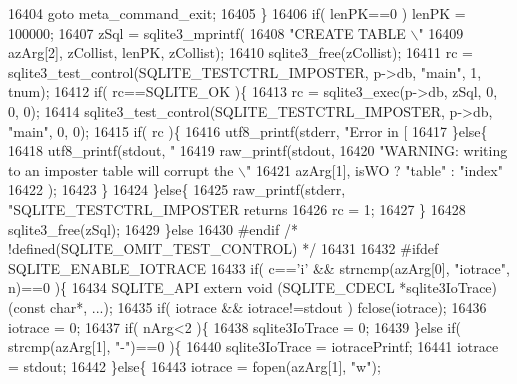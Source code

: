 \begin{DoxyCode}
{{{{{{{{{{{{{{{{{{{{{{{{{{{{{{{{{{{{{{{{{{{{16404       \textcolor{keywordflow}{goto} meta\_command\_exit;
16405     \}
16406     \textcolor{keywordflow}{if}( lenPK==0 ) lenPK = 100000;
16407     zSql = sqlite3_mprintf(
16408           \textcolor{stringliteral}{"CREATE TABLE \(\backslash\)"%
16409           azArg[2], zCollist, lenPK, zCollist);
16410     sqlite3_free(zCollist);
16411     rc = sqlite3_test_control(SQLITE_TESTCTRL_IMPOSTER, p->db, \textcolor{stringliteral}{"main"}, 1, tnum);
16412     \textcolor{keywordflow}{if}( rc==SQLITE_OK )\{
16413       rc = sqlite3_exec(p->db, zSql, 0, 0, 0);
16414       sqlite3_test_control(SQLITE_TESTCTRL_IMPOSTER, p->db, \textcolor{stringliteral}{"main"}, 0, 0);
16415       \textcolor{keywordflow}{if}( rc )\{
16416         utf8_printf(stderr, \textcolor{stringliteral}{"Error in [%
16417       \}\textcolor{keywordflow}{else}\{
16418         utf8_printf(stdout, \textcolor{stringliteral}{"%
16419         raw_printf(stdout,
16420           \textcolor{stringliteral}{"WARNING: writing to an imposter table will corrupt the \(\backslash\)"%
16421           azArg[1], isWO ? \textcolor{stringliteral}{"table"} : \textcolor{stringliteral}{"index"}
16422         );
16423       \}
16424     \}\textcolor{keywordflow}{else}\{
16425       raw_printf(stderr, \textcolor{stringliteral}{"SQLITE\_TESTCTRL\_IMPOSTER returns %
16426       rc = 1;
16427     \}
16428     sqlite3_free(zSql);
16429   \}\textcolor{keywordflow}{else}
16430 \textcolor{preprocessor}{#endif }\textcolor{comment}{/* !defined(SQLITE\_OMIT\_TEST\_CONTROL) */}\textcolor{preprocessor}{}
16431 
16432 \textcolor{preprocessor}{#ifdef SQLITE\_ENABLE\_IOTRACE}
16433   \textcolor{keywordflow}{if}( c==\textcolor{charliteral}{'i'} && strncmp(azArg[0], \textcolor{stringliteral}{"iotrace"}, n)==0 )\{
16434     SQLITE_API \textcolor{keyword}{extern} void (SQLITE_CDECL *sqlite3IoTrace)(\textcolor{keyword}{const} \textcolor{keywordtype}{char}*, ...);
16435     \textcolor{keywordflow}{if}( iotrace && iotrace!=stdout ) fclose(iotrace);
16436     iotrace = 0;
16437     \textcolor{keywordflow}{if}( nArg<2 )\{
16438       sqlite3IoTrace = 0;
16439     \}\textcolor{keywordflow}{else} \textcolor{keywordflow}{if}( strcmp(azArg[1], \textcolor{stringliteral}{"-"})==0 )\{
16440       sqlite3IoTrace = iotracePrintf;
16441       iotrace = stdout;
16442     \}\textcolor{keywordflow}{else}\{
16443       iotrace = fopen(azArg[1], \textcolor{stringliteral}{"w"});
}}}}}}}}}}}}}}}}}}}}}}}}}}}}}}}}}}}}}}}}}}}}}}}}}
\end{DoxyCode}
